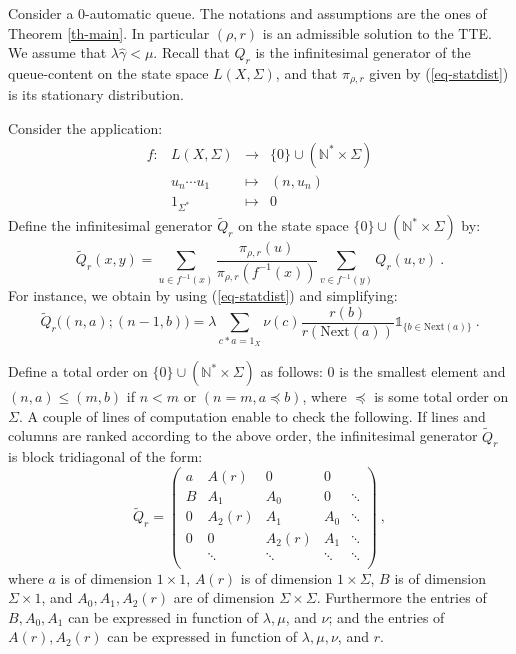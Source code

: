 \documentclass[11pt,a4paper]{article}
\theoremstyle{remark}
\def\Blackboardfont{\mathbb}
\def\rig{\text{Next}}
\def\N{{\Blackboardfont N}}
\def\un{{\mathbb 1}}
\def\eref#1{(\ref{#1})}
\begin{document}
\medskip

Consider a 0-automatic queue. The notations and assumptions are the
ones of Theorem \ref{th-main}. In particular $(\rho,r)$ is an
admissible solution to the TTE. We assume that $\lambda
\widehat{\gamma}<\mu$.  Recall that $Q_r$ is the infinitesimal
generator of the queue-content on the state space
$L(X,\Sigma)$, and that $\pi_{\rho,r}$ given by \eref{eq-statdist} is its stationary
distribution.

Consider the application:
\[
\begin{array}{cccc}
f: & L(X,\Sigma) & \longrightarrow & \{0\}\cup (\N^*\times \Sigma) \\
& u_n\cdots u_1 & \longmapsto & (n,u_n) \\
& 1_{\Sigma^*} & \longmapsto & 0
\end{array}
\]
Define the infinitesimal generator $\widetilde{Q}_r$ on the state space
$\{0\}\cup (\N^*\times \Sigma)$ by:
\begin{equation}\label{eq-tildeQ}
\widetilde{Q}_r(x,y) = \sum_{u\in f^{-1}(x)}
\frac{\pi_{\rho,r}(u)}{\pi_{\rho,r}(f^{-1}(x))} \sum_{v\in f^{-1}(y)}
Q_r(u,v) \:.
\end{equation}
For instance, we obtain by using \eref{eq-statdist} and simplifying:
\[
\widetilde{Q}_r\bigl( (n,a); (n-1,b) \bigr) = \lambda  \sum_{c\ast
  a=1_X} \nu(c) \frac{r(b)}{r(\rig(a))}\un_{\{b \in \rig(a)\}} \:.
\]

Define a total order on $\{0\}\cup (\N^*\times \Sigma)$ as
follows: $0$ is the smallest element and $(n,a)\leq (m,b)$ if $n<
m$ or $(n=m, a\preceq b)$, where $\preceq$ is some total order on
$\Sigma$. A couple of lines of computation enable to check the
following. If lines and columns are ranked according to the above
order, the infinitesimal generator $\widetilde{Q}_r$ is block
tridiagonal of the form:
\begin{equation}\label{eq-QBD}
\widetilde{Q}_r=
\left(\begin{array}{ccccc}
  a & A(r) & 0 & 0 &  \\
  B & A_1 & A_0 & 0 & \ddots \\
  0 & A_2(r) & A_1 & A_0 & \ddots \\
  0 & 0 & A_2(r) & A_1 & \ddots \\
   & \ddots & \ddots & \ddots & \ddots \\
\end{array}\right) \:,
\end{equation}
where $a$ is of dimension $1\times 1$, $A(r)$ is of dimension $1\times \Sigma$, $B$ is
of dimension $\Sigma \times 1$, and $A_0,A_1,A_2(r)$ are of dimension
$\Sigma\times \Sigma$. Furthermore the entries of $B,A_0,A_1$ can be
expressed in function of $\lambda,\mu$, and $\nu$; and the entries of
$A(r),A_2(r)$ can be expressed in function of
$\lambda,\mu,\nu$, and $r$.
\end{document}
